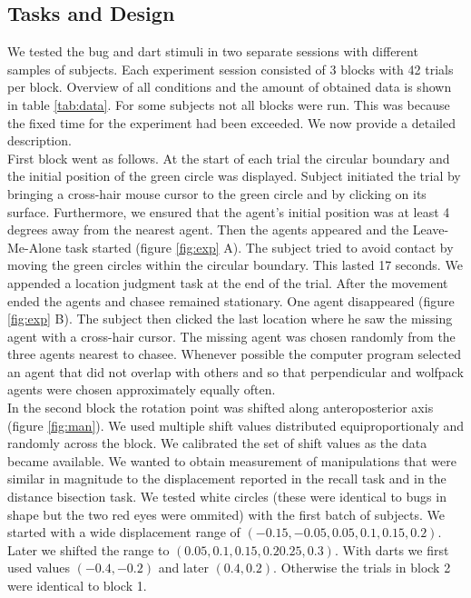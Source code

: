 \documentclass[10pt]{article}
\begin{document}
\subsection*{Tasks and Design}
We tested the bug and dart stimuli in two separate sessions with different samples of subjects. 
Each experiment session consisted of 3 blocks with 42 trials per block.  
Overview of all conditions and the amount of obtained data is shown in table \ref{tab:data}. For some subjects not all blocks were run. This was  because the fixed time for the experiment had been exceeded. 
We now provide a detailed description. \\
First block went as follows. 
At the start of each trial the circular boundary and the initial position of the green circle was displayed. 
Subject initiated the trial by bringing a cross-hair mouse cursor to the green circle and by clicking on its surface. 
Furthermore, we ensured that the agent's initial position was at least 4 degrees away from the nearest agent. 
Then the agents appeared and the Leave-Me-Alone task started (figure \ref{fig:exp} A). The subject tried to avoid contact by moving the green circles within the circular boundary. 
This lasted 17 seconds. 
We appended a location judgment task at the end of the trial. 
After the movement ended the agents and chasee remained stationary. 
One agent disappeared (figure \ref{fig:exp} B). 
The subject then clicked the last location where he saw the missing agent with a cross-hair cursor. 
The missing agent was chosen randomly from the three agents nearest to chasee. 
Whenever possible the computer program selected an agent that did not overlap with others and so that perpendicular and wolfpack agents were chosen approximately equally often. \\
In the second block the rotation point was shifted along anteroposterior axis (figure \ref{fig:man}). 
We used multiple shift values distributed equiproportionaly and randomly across the block. 
We calibrated the set of shift values as the data became available. 
We wanted to obtain measurement of manipulations that were similar in magnitude to the displacement reported in the recall task and in the distance bisection task. 
We tested white circles (these were identical to bugs in shape but the two red eyes were ommited) with the first batch of subjects. 
We started with a wide displacement range of $(-0.15, -0.05, 0.05, 0.1, 0.15, 0.2)$. 
Later we shifted the range to $(0.05, 0.1,0.15, 0.2 0.25,0.3)$. 
With darts we first used values $(-0.4, -0.2)$ and later $(0.4, 0.2)$. 
Otherwise the trials in block 2 were identical to block 1. 
\end{document}
